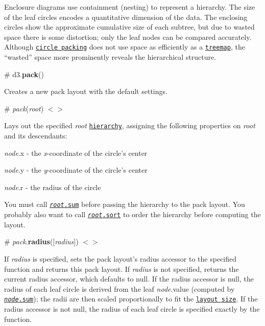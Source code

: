 \href{http://bl.ocks.org/mbostock/ca5b03a33affa4160321}{\tt }

Enclosure diagrams use containment (nesting) to represent a hierarchy. The size of the leaf circles encodes a quantitative dimension of the data. The enclosing circles show the approximate cumulative size of each subtree, but due to wasted space there is some distortion; only the leaf nodes can be compared accurately. Although \href{http://en.wikipedia.org/wiki/Circle_packing}{\tt circle packing} does not use space as efficiently as a \href{#treemap}{\tt treemap}, the “wasted” space more prominently reveals the hierarchical structure.

\label{_pack}%
\# d3.{\bfseries pack}()

Creates a new pack layout with the default settings.

\label{__pack}%
\# {\itshape pack}({\itshape root}) \href{https://github.com/d3/d3-hierarchy/blob/master/src/pack/index.js#L15}{\tt $<$$>$}

Lays out the specified {\itshape root} \href{#hierarchy}{\tt hierarchy}, assigning the following properties on {\itshape root} and its descendants\+:


\begin{DoxyItemize}
\item {\itshape node}.x -\/ the {\itshape x}-\/coordinate of the circle’s center
\item {\itshape node}.y -\/ the {\itshape y}-\/coordinate of the circle’s center
\item {\itshape node}.r -\/ the radius of the circle
\end{DoxyItemize}

You must call \href{#node_sum}{\tt {\itshape root}.sum} before passing the hierarchy to the pack layout. You probably also want to call \href{#node_sort}{\tt {\itshape root}.sort} to order the hierarchy before computing the layout.

\label{_pack_radius}%
\# {\itshape pack}.{\bfseries radius}(\mbox{[}{\itshape radius}\mbox{]}) \href{https://github.com/d3/d3-hierarchy/blob/master/src/pack/index.js#L30}{\tt $<$$>$}

If {\itshape radius} is specified, sets the pack layout’s radius accessor to the specified function and returns this pack layout. If {\itshape radius} is not specified, returns the current radius accessor, which defaults to null. If the radius accessor is null, the radius of each leaf circle is derived from the leaf {\itshape node}.value (computed by \href{#node_sum}{\tt {\itshape node}.sum}); the radii are then scaled proportionally to fit the \href{#pack_size}{\tt layout size}. If the radius accessor is not null, the radius of each leaf circle is specified exactly by the function.

